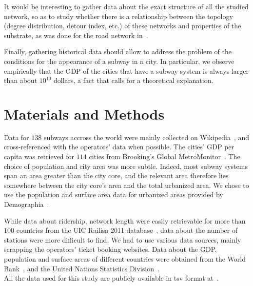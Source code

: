 It would be interesting to gather data about the exact structure of all the
studied network, so as to study whether there is a relationship between the
topology (degree distribution, detour index, etc.) of these networks and
properties of the substrate, as was done for the road network
in~\cite{Levinson:2012}.

Finally, gathering historical data should allow to address the problem of the
conditions for the appearance of a subway in a city. In particular, we observe
empirically that the GDP of the cities that have a subway system is always
larger than about $10^{10}$ dollars, a fact that calls for a theoretical
explanation. 



\section*{Materials and Methods}

Data for $138$ subways accross the world were mainly collected on Wikipedia~\cite{Wiki}, and cross-referenced with the operators' data when possible. The cities' GDP per capita was retrieved for $114$ cities from Brooking's Global MetroMonitor~\cite{Brookings}. The choice of population and city area was more subtle. Indeed, most subway systems span an area greater than the city core, and the relevant area therefore lies somewhere between the city core's area and the total urbanized area. We chose to use the population and surface area data for urbanized areas provided by Demographia~\cite{Demographia}.

While data about ridership, network length were easily retrievable for more than $100$ countries from the UIC Railisa 2011 database~\cite{railisa}, data about the number of stations were more difficult to find. We had to use various data sources, mainly scrapping the operators' ticket booking websites. Data about the GDP, population and surface areas of different countries were obtained from the World Bank~\cite{WorldBank}, and the United Nations Statistics Division~\cite{UnitedNations}.\\

All the data used for this study are publicly available in tsv format at~\cite{data_repo}.


